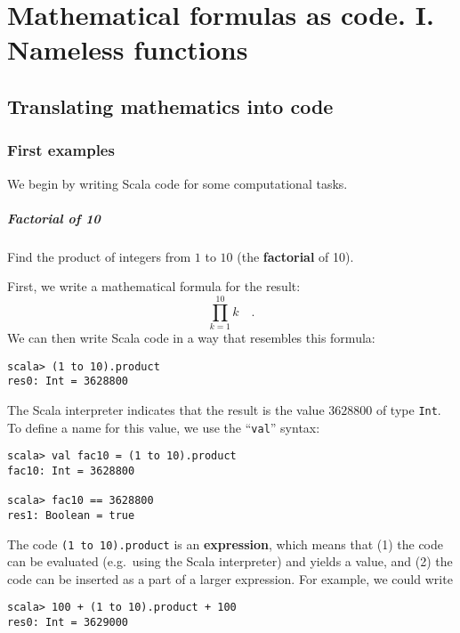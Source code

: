 
\chapter{Mathematical formulas as code. I. Nameless functions\label{chap:1-Values,-types,-expressions,}}

\section{Translating mathematics into code}

\subsection{First examples}

We begin by writing Scala code for some computational tasks.

\paragraph{Factorial of 10}

Find the product of integers from $1$ to $10$ (the \textbf{factorial}
of 10).

First, we write a mathematical formula for the result:
\[
\prod_{k=1}^{10}k\quad.
\]
We can then write Scala code in a way that resembles this formula:
\begin{lstlisting}
scala> (1 to 10).product
res0: Int = 3628800
\end{lstlisting}
The Scala interpreter indicates that the result is the value $3628800$
of type \lstinline!Int!.
To define a name for this value, we use the ``\lstinline!val!''
syntax:
\begin{lstlisting}
scala> val fac10 = (1 to 10).product
fac10: Int = 3628800

scala> fac10 == 3628800
res1: Boolean = true
\end{lstlisting}
The code \texttt{}\lstinline!(1 to 10).product!
is an \textbf{expression}, which means that (1)
the code can be evaluated (e.g.~using the Scala interpreter) and
yields a value, and (2) the code can be inserted as a part of a larger
expression. For example, we could write
\begin{lstlisting}
scala> 100 + (1 to 10).product + 100
res0: Int = 3629000
\end{lstlisting}

